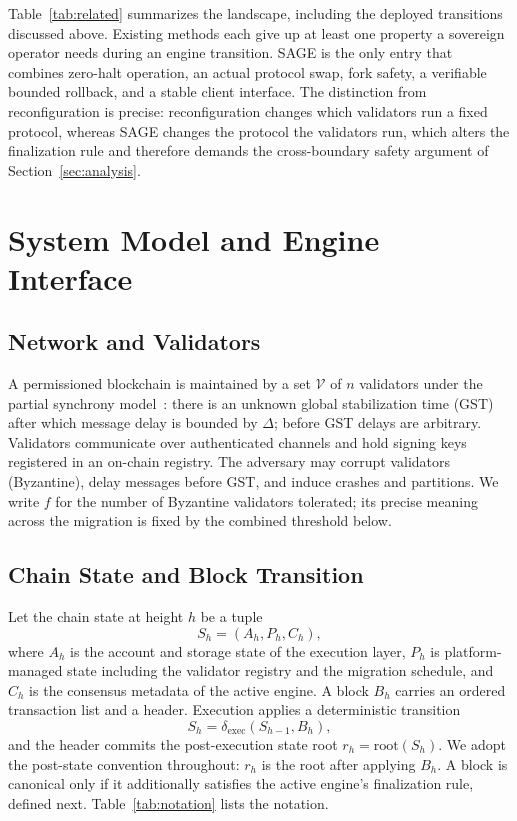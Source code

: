 \documentclass[journal]{IEEEtran}
\theoremstyle{remark}
\begin{document}
Table~\ref{tab:related} summarizes the landscape, including the deployed transitions
discussed above. Existing methods each give up at least one property a sovereign operator
needs during an engine transition. SAGE is the only entry that combines zero-halt operation,
an actual protocol swap, fork safety, a verifiable bounded rollback, and a stable client
interface. The distinction from reconfiguration is precise: reconfiguration changes which
validators run a fixed protocol, whereas SAGE changes the protocol the validators run, which
alters the finalization rule and therefore demands the cross-boundary safety argument of
Section~\ref{sec:analysis}.

\section{System Model and Engine Interface}
\label{sec:model}

\subsection{Network and Validators}
A permissioned blockchain is maintained by a set $\mathcal{V}$ of $n$ validators under the
partial synchrony model~\cite{dls}: there is an unknown global stabilization time (GST) after
which message delay is bounded by $\Delta$; before GST delays are arbitrary. Validators
communicate over authenticated channels and hold signing keys registered in an on-chain
registry. The adversary may corrupt validators (Byzantine), delay messages before GST, and
induce crashes and partitions. We write $f$ for the number of Byzantine validators tolerated;
its precise meaning across the migration is fixed by the combined threshold below.

\subsection{Chain State and Block Transition}
Let the chain state at height $h$ be a tuple
\begin{equation}
S_h = (A_h, P_h, C_h),
\end{equation}
where $A_h$ is the account and storage state of the execution layer, $P_h$ is
platform-managed state including the validator registry and the migration schedule, and
$C_h$ is the consensus metadata of the active engine. A block $B_h$ carries an ordered
transaction list and a header. Execution applies a deterministic transition
\begin{equation}
S_{h} = \delta_{\mathrm{exec}}(S_{h-1}, B_h),
\end{equation}
and the header commits the post-execution state root $r_h = \mathrm{root}(S_h)$. We adopt the
post-state convention throughout: $r_h$ is the root after applying $B_h$. A block is
canonical only if it additionally satisfies the active engine's finalization rule, defined
next. Table~\ref{tab:notation} lists the notation.
\end{document}
